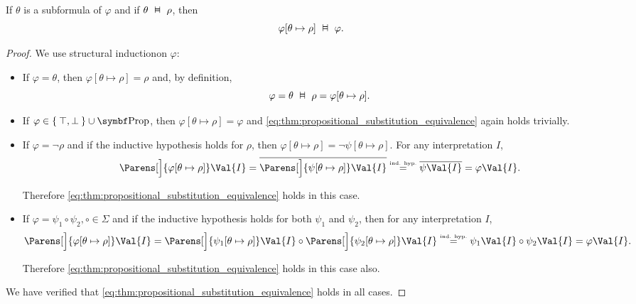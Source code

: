 \begin{proposition}\label{thm:propositional_substitution_equivalence}
  If \( \theta \) is a subformula of \( \varphi \) and if \( \theta \Sequiv \rho \), then
  \begin{equation}\label{eq:thm:propositional_substitution_equivalence}
    \varphi[\theta \mapsto \rho] \Sequiv \varphi.
  \end{equation}
\end{proposition}
\begin{proof}
  We use structural induction\IND on \( \varphi \):

  \begin{itemize}
    \item If \( \varphi = \theta \), then \( \varphi[\theta \mapsto \rho] = \rho \) and, by definition,
    \begin{equation*}
      \varphi = \theta \Sequiv \rho = \varphi[\theta \mapsto \rho].
    \end{equation*}

    \item If \( \varphi \in \Set{ \top, \bot } \cup \Bold{Prop} \), then \( \varphi[\theta \mapsto \rho] = \varphi \) and \eqref{eq:thm:propositional_substitution_equivalence} again holds trivially.

    \item If \( \varphi = \neg \rho \) and if the inductive hypothesis holds for \( \rho \), then \( \varphi[\theta \mapsto \rho] = \neg \psi[\theta \mapsto \rho] \). For any interpretation \( I \),
    \begin{equation*}
      \Parens[\Big]{ \varphi[\theta \mapsto \rho] }\Val{I}
      =
      \Ol{\Parens[\Big]{ \psi[\theta \mapsto \rho] }\Val{I}}
      \overset {\IndHyp} =
      \Ol{\psi\Val{I}}
      =
      \varphi\Val{I}.
    \end{equation*}

    Therefore \eqref{eq:thm:propositional_substitution_equivalence} holds in this case.

    \item If \( \varphi = \psi_1 \circ \psi_2, \circ \in \Sigma \) and if the inductive hypothesis holds for both \( \psi_1 \) and \( \psi_2 \), then for any interpretation \( I \),
    \begin{equation*}
      \Parens[\Big]{ \varphi[\theta \mapsto \rho] }\Val{I}
      =
      \Parens[\Big]{ \psi_1[\theta \mapsto \rho] }\Val{I} \circ \Parens[\Big]{ \psi_2[\theta \mapsto \rho] }\Val{I}
      \overset {\IndHyp} =
      \psi_1\Val{I} \circ \psi_2\Val{I}
      =
      \varphi\Val{I}.
    \end{equation*}

    Therefore \eqref{eq:thm:propositional_substitution_equivalence} holds in this case also.
  \end{itemize}

  We have verified that \eqref{eq:thm:propositional_substitution_equivalence} holds in all cases.
\end{proof}

